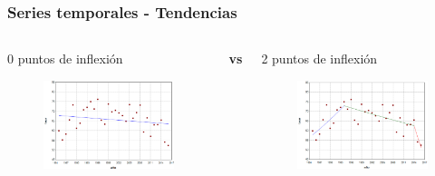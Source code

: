 \documentclass{beamer}
\begin{document}
\begin{frame}\frametitle{Series temporales - Tendencias}
	\begin{columns}
		\begin{column}{0.5\textwidth}
			\centering \normalsize 0 puntos de inflexión
			\begin{figure}
				\includegraphics[width=\textwidth]{images/jpo0.png}
			\end{figure}
			
		\end{column}
		\large{\textbf{vs}}
		\begin{column}{0.5\textwidth}
			\centering \normalsize 2 puntos de inflexión
			\begin{figure}
				\centering
				\includegraphics[width=\textwidth]{images/jpo2.png}
			\end{figure}
		\end{column}
	\end{columns}
\end{frame}
\end{document}
